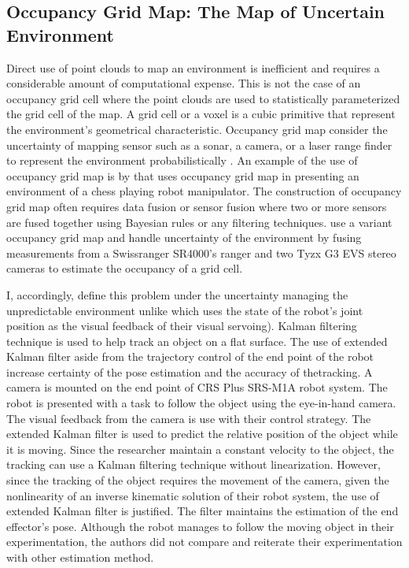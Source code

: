 \subsection{Occupancy Grid Map: The Map of Uncertain Environment}\label{sec:occupancy_map}

Direct use of point clouds to map an environment is inefficient and requires a considerable
amount of computational expense. This is not the case of an occupancy grid cell where the
point clouds are used to statistically parameterized the grid cell of the map. A grid cell or a voxel
is a cubic primitive that represent the environment’s geometrical characteristic.
Occupancy grid map consider the uncertainty of mapping sensor such as a sonar, a camera, or
a laser range finder to represent the environment probabilistically \parencite{Moravec1988}.
An example of the use of occupancy grid map is by \textcite{Matuszek2011} that
uses occupancy grid map in presenting an environment of a chess playing robot manipulator.
The construction of occupancy grid map often requires data fusion or sensor fusion where two
or more sensors are fused together using Bayesian rules or any filtering techniques.
\textcite{Rybski2012} use a variant occupancy grid map and handle uncertainty of the environment by
fusing measurements from a Swissranger SR4000's ranger and two Tyzx G3 EVS stereo
cameras to estimate the occupancy of a grid cell.

I,
accordingly, define this problem under the uncertainty managing the unpredictable environment
unlike \textcite{Janabi-Sharifi2010} which uses the state of the robot’s joint position as the
visual feedback of their visual servoing). Kalman filtering technique is used to help track an
object on a flat surface. The use of extended Kalman filter aside from the trajectory control of
the end point of the robot increase certainty of the pose estimation and the accuracy of thetracking. 
A camera is mounted on the end point of CRS Plus SRS-M1A robot system. The robot
is presented with a task to follow the object using the eye-in-hand camera. The visual feedback
from the camera is use with their control strategy. The extended Kalman filter is used to predict
the relative position of the object while it is moving. Since the researcher maintain a constant
velocity to the object, the tracking can use a Kalman filtering technique without linearization.
However, since the tracking of the object requires the movement of the camera, given the
nonlinearity of an inverse kinematic solution of their robot system, the use of extended Kalman
filter is justified. The filter maintains the estimation of the end effector's pose. Although the robot
manages to follow the moving object in their experimentation, the authors did not compare and
reiterate their experimentation with other estimation method.

